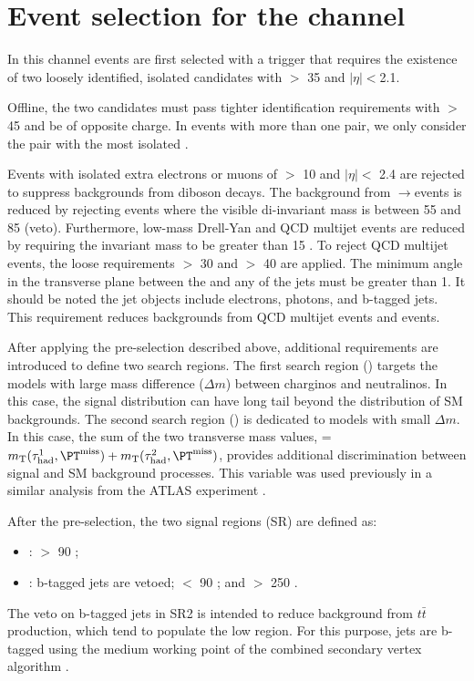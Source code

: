 \section{\texorpdfstring{Event selection for the \tauTau channel}{Event selection for the tau-tau channel}}
\label{sect:tauTauCuts}
In this channel events are first selected with a trigger \cite{Khachatryan:2015hwa,Chatrchyan:2012xi,Chatrchyan:2011nv}
that requires the existence of
two loosely identified, isolated \Tau candidates with \PT $>$ 35 \GeV and $|\eta|<$2.1.   

Offline, the two \Tau candidates must pass tighter identification requirements with \PT $>$ 45 \GeV and be of opposite charge.
In events with more than one \tauTau pair, we only consider the pair with the most isolated \Tau. 

Events with isolated extra electrons or muons of \PT $>$ 10 \GeV and $|\eta| <$ 2.4 
are rejected to suppress %
backgrounds from diboson decays.
The background from \Z$\rightarrow$\tauTau events is reduced by rejecting events where the visible
di-\Tau invariant mass is between 55 and 85 \GeV (\Z veto).  Furthermore, 
low-mass Drell-Yan and QCD multijet events are reduced by requiring the invariant mass to be greater than 15 \GeV.
To reject QCD multijet events, the loose requirements \MPT $>$ 30 \GeV and \mttwo $>$ 40 \GeV are applied.
The minimum angle \deltaphi in the transverse plane between the \ptvecmiss and any of the jets must be greater than 1. 
It should be noted the jet objects include electrons, photons, \Tau and b-tagged jets.
This requirement reduces backgrounds from QCD multijet events and \wjets events.

After applying the pre-selection described above,
additional requirements are introduced to define two search regions.
The first search region (\binone) targets the models with large mass difference ($\Delta m$) 
between charginos and neutralinos.
In this case, the \mttwo signal distribution can have long tail beyond the 
distribution of SM backgrounds.
The second search region (\bintwo) is dedicated to models with small $\Delta m$.  
In this case, the sum of the two transverse mass values, \SumMT = $\mt(\Tau^1,\MPT) + \mt(\Tau^2,\MPT)$, 
provides additional discrimination between signal and SM background processes.
This variable was used previously in a similar analysis from the ATLAS experiment \cite{Aad:2014yka}.

After the pre-selection, the two signal regions (SR) are defined as:
\begin{itemize}
\item {\bf \binone}: \mttwo $>$ 90 \GeV;
\item {\bf \bintwo}: b-tagged jets are vetoed; \mttwo $<$ 90 \GeV; and \SumMT $>$ 250 \GeV.
\end{itemize}
The veto on b-tagged jets in SR2 is intended to reduce
background from $t\bar{t}$ production, which
tend to populate the low \mttwo region.  For this purpose, jets are b-tagged
using the medium working point of the combined secondary vertex algorithm \cite{Chatrchyan:2012jua}. 

